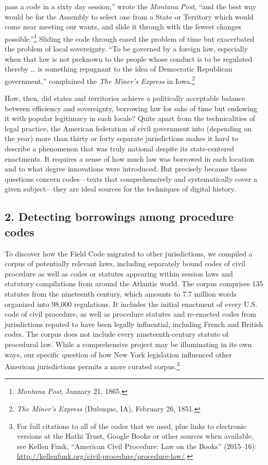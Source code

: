\documentclass[12pt,]{article}
\let\rmarkdownfootnote\footnote%
\def\footnote{\protect\rmarkdownfootnote}
\begin{document}
pass a code in a sixty day session,'' wrote the \emph{Montana Post},
``and the best way would be for the Assembly to select one from a State
or Territory which would come near meeting our wants, and slide it
through with the fewest changes possible.''\footnote{\emph{Montana
  Post}, January 21, 1865.} Sliding the code through eased the problem
of time but exacerbated the problem of local sovereignty. ``To be
governed by a foreign law, especially when that law is not preknown to
the people whose conduct is to be regulated thereby \ldots{} is
something repugnant to the idea of Democratic Republican government,''
complained the \emph{The Miner's Express} in Iowa.\footnote{\emph{The
  Miner's Express} (Dubuque, IA), February 26, 1851.}

How, then, did states and territories achieve a politically acceptable
balance between efficiency and sovereignty, borrowing law for sake of
time but endowing it with popular legitimacy in each locale? Quite apart
from the technicalities of legal practice, the American federation of
civil government into (depending on the year) more than thirty or forty
separate jurisdictions makes it hard to describe a phenomenon that was
truly national despite its state-centered enactments. It requires a
sense of how much law was borrowed in each location and to what degree
innovations were introduced. But precisely because these questions
concern codes---texts that comprehensively and systematically cover a
given subject---they are ideal sources for the techniques of digital
history.

\hypertarget{detecting-borrowings-among-procedure-codes}{%
\subsection{2. Detecting borrowings among procedure
codes}\label{detecting-borrowings-among-procedure-codes}}

To discover how the Field Code migrated to other jurisdictions, we
compiled a corpus of potentially relevant laws, including separately
bound codes of civil procedure as well as codes or statutes appearing
within session laws and statutory compilations from around the Atlantic
world. The corpus comprises 135 statutes from the nineteenth century,
which amounts to 7.7 million words organized into 98,000 regulations. It
includes the initial enactment of every U.S. code of civil procedure, as
well as procedure statutes and re-enacted codes from jurisdictions
reputed to have been legally influential, including French and British
codes. The corpus does not include every nineteenth-century statute of
procedural law. While a comprehensive project may be illuminating in its
own ways, our specific question of how New York legislation influenced
other American jurisdictions permits a more curated corpus.\footnote{For
  full citations to all of the codes that we used, plus links to
  electronic versions at the Hathi Trust, Google Books or other sources
  when available, see Kellen Funk, ``American Civil Procedure: Law on
  the Books'' (2015--16):
  \url{http://kellenfunk.org/civil-procedure/procedure-law/}.}
\end{document}
